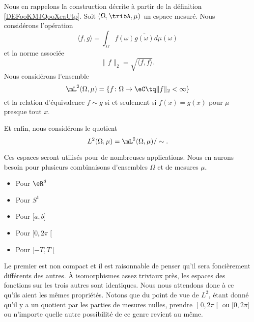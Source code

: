 \begin{normaltext}  \label{NORMooUEIEooYtlFse}
    Nous en rappelons la construction décrite à partir de la définition \ref{DEFooKMJQooXeaUtp}. Soit \( (\Omega,\tribA,\mu)\) un espace mesuré. Nous considérons l'opération
    \begin{equation}    \label{DefProdScalLubrgTj}
        \langle f, g\rangle =\int_{\Omega}f(\omega)\overline{ g(\omega)}d\mu(\omega)
    \end{equation}
    et la norme associée
    \begin{equation}
        \| f \|_2=\sqrt{\langle f, f\rangle }.
    \end{equation}
    Nous considérons l'ensemble
    \begin{equation}
        \mL^2(\Omega,\mu)=\{ f\colon \Omega\to \eC\tq \| f \|_2<\infty \}
    \end{equation}
    et la relation d'équivalence \( f\sim g\) si et seulement si \( f(x)=g(x)\) pour \( \mu\)-presque tout \( x\).

    Et enfin, nous considérons le quotient
    \begin{equation}
        L^2(\Omega,\mu)=\mL^2(\Omega,\mu)/\sim.
    \end{equation}
\end{normaltext}

Ces espaces seront utilisés pour de nombreuses applications. Nous en aurons besoin pour plusieurs combinaisons d'ensembles \( \Omega\) et de mesures \( \mu\).
\begin{itemize}
    \item Pour \( \eR^d\)
    \item Pour \( S^1\)
    \item Pour \( \mathopen[ a , b \mathclose]\)
    \item Pour \( \mathopen[ 0 , 2\pi \mathclose[\)
        \item Pour \( \mathopen[ -T , T \mathclose[\)
\end{itemize}
Le premier est non compact et il est raisonnable de penser qu'il sera foncièrement différents des autres. À isomorphismes assez triviaux près, les espaces des fonctions sur les trois autres sont identiques. Nous nous attendons donc à ce qu'ils aient les mêmes propriétés. Notons que du point de vue de \( L^2\), étant donné qu'il y a un quotient par les parties de mesures nulles, prendre \( \mathopen] 0 , 2\pi \mathclose[\) ou \( \mathopen[ 0 , 2\pi \mathclose]\) ou n'importe quelle autre possibilité de ce genre revient au même.

